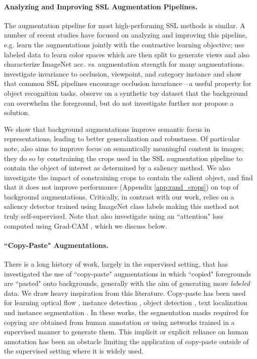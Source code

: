 \documentclass[twoside,11pt]{article}
\begin{document}
\paragraph{Analyzing and Improving SSL Augmentation Pipelines.} The augmentation pipeline for most high-performing SSL methods is similar. A number of recent studies have focused on analyzing and improving this pipeline, e.g. \citet{tamkin2021viewmaker} learn the augmentations jointly with the contrastive learning objective; \citet{tian_what_2020} use labeled data to learn color spaces which are then split to generate views and also characterize ImageNet acc. \textit{vs}. augmentation strength for many augmentations. \citet{purushwalkam2020demystifying} investigate invariance to occlusion, viewpoint, and category instance and show that common SSL pipelines encourage occlusion invariance---a useful property for object recognition tasks.  \citet{tian_what_2020} observe on a synthetic toy dataset that the background can overwhelm the foreground, but do not investigate further nor propose a solution.

 We show that background augmentations improve semantic focus in representations, leading to better generalization and robustness. Of particular note, \citet{selvaraju2020casting} also aims to improve focus on semantically meaningful content in images; they do so by constraining the crops used in the SSL augmentation pipeline to contain the object of interest as determined by a saliency method. We also investigate the impact of constraining crops to contain the salient object, and find that it does not improve performance (Appendix \ref{app:rand_crops}) on top of background augmentations. Critically, in contrast with our work, \citet{selvaraju2020casting} relies on a saliency detector trained using ImageNet class labels making this method not truly self-supervised. Note that \citet{selvaraju2020casting} also investigate using an ``attention" loss computed using Grad-CAM \citep{grad-cam_2017}, which we discuss below.

\paragraph{``Copy-Paste" Augmentations.} There is a long history of work, largely in the supervised setting, that has investigated the use of ``copy-paste" augmentations in which ``copied" foregrounds are ``pasted" onto backgrounds, generally with the aim of generating more \textit{labeled} data. We draw heavy inspiration from this literature. Copy-paste has been used for learning optical flow \citep{dosovitskiy_flownet_2015}, instance detection \citep{Dwibedi_2017_ICCV}, object detection \citep{georgakis_synthesizing_2017, Dvornik_2018_ECCV}, text localization \citep{gupta_synthetic_2016} and instance segmentation \citep{remez_learning_2018, fang_instaboost_2019, ghiasi2020simple}. In these works, the segmentation masks required for copying are obtained from human annotation or using networks trained in a supervised manner to generate them. This implicit or explicit reliance on human annotation has been an obstacle limiting the application of copy-paste outside of the supervised setting where it is widely used. 
\end{document}
